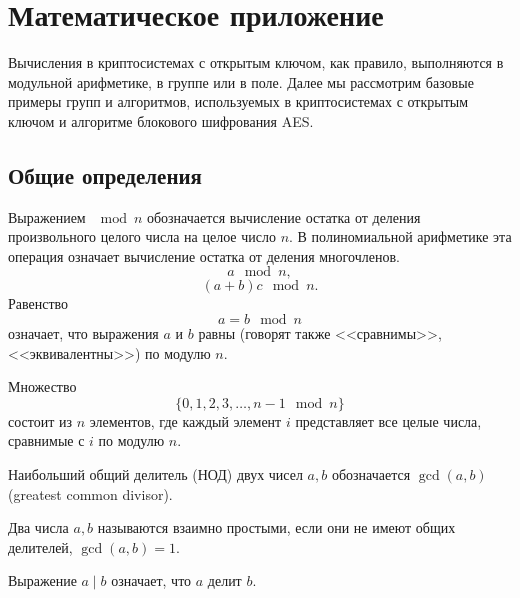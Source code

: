 \documentclass[10pt,a4paper]{book}
\begin{document}








\appendix

\chapter{Математическое приложение}
\label{chap:discrete-math}

Вычисления в криптосистемах с открытым ключом, как правило, выполняются в модульной арифметике, в группе или в поле. Далее мы рассмотрим базовые примеры групп и алгоритмов, используемых в криптосистемах с открытым ключом и алгоритме блокового шифрования AES.

\section*{Общие определения}

Выражением $\mod n$ обозначается вычисление остатка от деления произвольного целого числа на целое число $n$. В полиномиальной арифметике эта операция означает вычисление остатка от деления многочленов.
    \[ a\mod n, \]
    \[ (a + b) c\mod n. \]
Равенство
    \[ a = b \mod n \]
означает, что выражения $a$ и $b$ равны (говорят также <<сравнимы>>, <<эквивалентны>>) по модулю $n$.

Множество
    \[ \{ 0, 1, 2, 3,  \dots,  n-1 \mod n\} \]
состоит из $n$ элементов, где каждый элемент $i$ представляет все целые числа, сравнимые с $i$ по модулю $n$.

Наибольший общий делитель (НОД) двух чисел $a,b$ обозначается $\gcd(a,b)$ (greatest common divisor).

Два числа $a,b$ называются взаимно простыми, если они не имеют общих делителей, $\gcd(a,b) = 1$.

Выражение $a \mid b$ означает, что $a$ делит $b$.


\end{document}
